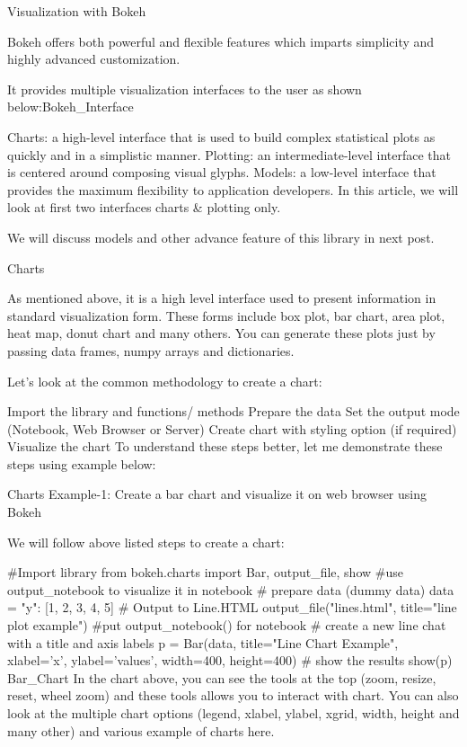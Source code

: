 
 

Visualization with Bokeh

Bokeh offers both powerful and flexible features which imparts simplicity and highly advanced customization. 



It provides multiple visualization interfaces to the user as shown below:Bokeh_Interface

Charts: a high-level interface that is used to build complex statistical plots as quickly and in a simplistic manner.
Plotting: an intermediate-level interface that is centered around composing visual glyphs.
Models: a low-level interface that provides the maximum flexibility to application developers.
In this article, we will look at first two interfaces charts & plotting only. 

We will discuss models and other advance feature of this library in next post.



Charts

As mentioned above, it is a high level interface used to present information in standard visualization form. 
These forms include box plot, bar chart, area plot, heat map, donut chart and many others. You can generate these plots just by passing data frames, numpy arrays and dictionaries.

Let’s look at the common methodology to create a chart:

Import the library and functions/ methods
Prepare the data
Set the output mode (Notebook, Web Browser or Server)
Create chart with styling option (if required)
Visualize the chart
To understand these steps better, let me demonstrate these steps using example below:

Charts Example-1: Create a bar chart and visualize it on web browser using Bokeh

We will follow above listed steps to create a chart:

#Import library
from bokeh.charts import Bar, output_file, show #use output_notebook to visualize it in notebook
# prepare data (dummy data)
data = {"y": [1, 2, 3, 4, 5]}
# Output to Line.HTML
output_file("lines.html", title="line plot example") #put output_notebook() for notebook
# create a new line chat with a title and axis labels
p = Bar(data, title="Line Chart Example", xlabel='x', ylabel='values', width=400, height=400)
# show the results
show(p)
Bar_Chart
In the chart above,  you can see the tools at the top (zoom, resize, reset, wheel zoom) and these 
tools allows you to interact with chart. 
You can also look at the multiple chart options (legend, xlabel, ylabel, xgrid, width, height and many other) and 
various example of charts here.


